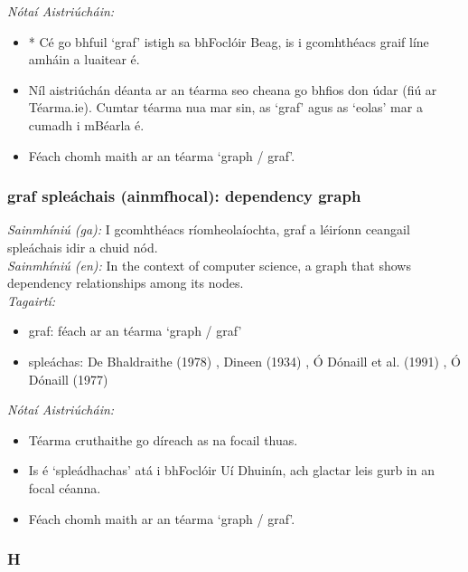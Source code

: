  \noindent \textit{Nótaí Aistriúcháin:}
\begin{itemize}
	\item * Cé go bhfuil `graf' istigh sa bhFoclóir Beag, is i gcomhthéacs graif líne amháin a luaitear é.
	\item Níl aistriúchán déanta ar an téarma seo cheana go bhfios don údar (fiú ar Téarma.ie). Cumtar téarma nua mar sin, as `graf' agus as `eolas' mar a cumadh i mBéarla é.
	\item Féach chomh maith ar an téarma `graph / graf'.
\end{itemize}


\subsubsection*{graf spleáchais (ainmfhocal): dependency graph}
 \noindent \textit{Sainmhíniú (ga):} I gcomhthéacs ríomheolaíochta, graf a léiríonn ceangail spleáchais idir a chuid nód.
\\
 \noindent \textit{Sainmhíniú (en):} In the context of computer science, a graph that shows dependency relationships among its nodes.
\\
 \noindent \textit{Tagairtí:}
\begin{itemize}
	\item graf: féach ar an téarma `graph / graf'
	\item spleáchas: De Bhaldraithe (1978) \cite{de-bhaldraithe}, Dineen (1934) \cite{dineen}, Ó Dónaill et al. (1991) \cite{focloir-beag}, Ó Dónaill (1977) \cite{odonaill}
\end{itemize}

 \noindent \textit{Nótaí Aistriúcháin:}
\begin{itemize}
	\item Téarma cruthaithe go díreach as na focail thuas.
	\item Is é `spleádhachas' atá i bhFoclóir Uí Dhuinín, ach glactar leis gurb in an focal céanna.
	\item Féach chomh maith ar an téarma `graph / graf'.
\end{itemize}


 \subsubsection*{H}

